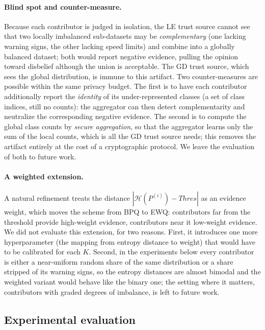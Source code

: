 \paragraph{Blind spot and counter-measure.}
Because each contributor is judged in isolation, the LE trust source cannot see that two locally imbalanced sub-datasets may be \emph{complementary} (one lacking warning signs, the other lacking speed limits) and combine into a globally balanced dataset; both would report negative evidence, pulling the opinion toward disbelief although the union is acceptable. The GD trust source, which sees the global distribution, is immune to this artifact. Two counter-measures are possible within the same privacy budget. The first is to have each contributor additionally report the \emph{identity} of its under-represented classes (a set of class indices, still no counts): the aggregator can then detect complementarity and neutralize the corresponding negative evidence. The second is to compute the global class counts by \emph{secure aggregation}, so that the aggregator learns only the sum of the local counts, which is all the GD trust source needs; this removes the artifact entirely at the cost of a cryptographic protocol. We leave the evaluation of both to future work.

\paragraph{A weighted extension.}
A natural refinement treats the distance $|\mathcal{H}(P^{(i)}) - \mathit{Thres}|$ as an evidence weight, which moves the scheme from \ac{BPQ} to \ac{EWQ}: contributors far from the threshold provide high-weight evidence, contributors near it low-weight evidence. We did not evaluate this extension, for two reasons. First, it introduces one more hyperparameter (the mapping from entropy distance to weight) that would have to be calibrated for each $K$. Second, in the experiments below every contributor is either a near-uniform random share of the same distribution or a share stripped of its warning signs, so the entropy distances are almost bimodal and the weighted variant would behave like the binary one; the setting where it matters, contributors with graded degrees of imbalance, is left to future work.

\subsection{Experimental evaluation}
\label{sec:dataset-trust:applications:gtsrb:eval}

